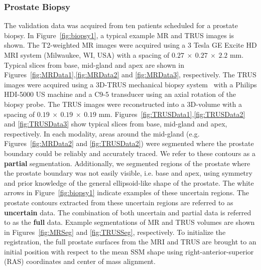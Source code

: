 \documentclass[journal]{IEEEtran}
\begin{document}
\subsubsection{Prostate Biopsy}\label{sec:biopsy}
The validation data was acquired from ten patients scheduled for a prostate biopsy. In Figure~\ref{fig:biopsy1}, a typical example MR and TRUS images is shown. The T2-weighted MR images were acquired using a 3 Tesla GE Excite HD MRI system (Milwaukee, WI, USA) with a spacing of $0.27~\times~0.27~\times~2.2$ mm. Typical slices from base, mid-gland and apex are shown in Figures~\ref{fig:MRData1},\ref{fig:MRData2} and \ref{fig:MRData3}, respectively. The TRUS images were acquired using a 3D-TRUS mechanical biopsy system~\cite{Bax08a} with a Philips HDI-5000 US machine and a C9-5 transducer using an axial rotation of the biopsy probe. The TRUS images were reconstructed into a 3D-volume with a spacing of $0.19~\times~0.19~\times~0.19$ mm. Figures~\ref{fig:TRUSData1},\ref{fig:TRUSData2} and \ref{fig:TRUSData3} show typical slices from base, mid-gland and apex, respectively. In each modality, areas around the mid-gland (e.g. Figures~\ref{fig:MRData2} and \ref{fig:TRUSData2}) were segmented where the prostate boundary could be reliably and accurately traced. We refer to these contours as a \textbf{partial} segmentation. Additionally, we segmented regions of the prostate where the prostate boundary was not easily visible, i.e. base and apex, using symmetry and prior knowledge of the general ellipsoid-like shape of the prostate. The white arrows in Figure~\ref{fig:biopsy1} indicate examples of these uncertain regions. The prostate contours extracted from these uncertain regions are referred to as \textbf{uncertain} data. The combination of both uncertain and partial data is referred to as the \textbf{full} data. Example segmentations of MR and TRUS volumes are shown in Figures~\ref{fig:MRSeg} and \ref{fig:TRUSSeg}, respectively. To initialize the registration, the full prostate surfaces from the MRI and TRUS are brought to an initial position with respect to the mean SSM shape using right-anterior-superior (RAS) coordinates and center of mass alignment.
\end{document}
